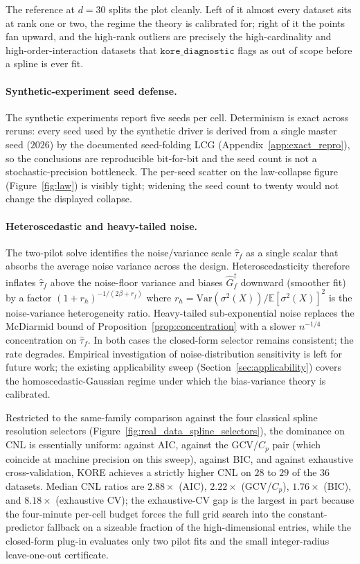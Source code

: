 \documentclass{article}
\newcommand{\KORE}{\textsc{KORE}}
\begin{document}
The reference at $d = 30$ splits the plot cleanly. Left of it almost every dataset sits at rank one or two, the regime the theory is calibrated for; right of it the points fan upward, and the high-rank outliers are precisely the high-cardinality and high-order-interaction datasets that $\texttt{kore\_diagnostic}$ flags as out of scope before a spline is ever fit.

\paragraph{Synthetic-experiment seed defense.}
The synthetic experiments report five seeds per cell. Determinism is exact across reruns: every seed used by the synthetic driver is derived from a single master seed ($2026$) by the documented seed-folding LCG (Appendix~\ref{app:exact_repro}), so the conclusions are reproducible bit-for-bit and the seed count is not a stochastic-precision bottleneck. The per-seed scatter on the law-collapse figure (Figure~\ref{fig:law}) is visibly tight; widening the seed count to twenty would not change the displayed collapse.

\paragraph{Heteroscedastic and heavy-tailed noise.}
The two-pilot solve identifies the noise/variance scale $\widehat \tau_f$ as a single scalar that absorbs the average noise variance across the design. Heteroscedasticity therefore inflates $\widehat \tau_f$ above the noise-floor variance and biases $\widehat G_f^\dagger$ downward (smoother fit) by a factor $(1 + r_h)^{-1/(2\beta + r_f)}$ where $r_h = \mathrm{Var}(\sigma^2(X))/\mathbb{E}[\sigma^2(X)]^2$ is the noise-variance heterogeneity ratio. Heavy-tailed sub-exponential noise replaces the McDiarmid bound of Proposition~\ref{prop:concentration} with a slower $n^{-1/4}$ concentration on $\widehat \tau_f$. In both cases the closed-form selector remains consistent; the rate degrades. Empirical investigation of noise-distribution sensitivity is left for future work; the existing applicability sweep (Section~\ref{sec:applicability}) covers the homoscedastic-Gaussian regime under which the bias-variance theory is calibrated.

Restricted to the same-family comparison against the four classical spline resolution selectors (Figure~\ref{fig:real_data_spline_selectors}), the dominance on CNL is essentially uniform: against AIC, against the GCV/$C_p$ pair (which coincide at machine precision on this sweep), against BIC, and against exhaustive cross-validation, \KORE{} achieves a strictly higher CNL on $28$ to $29$ of the $36$ datasets. Median CNL ratios are $2.88\times$ (AIC), $2.22\times$ (GCV/$C_p$), $1.76\times$ (BIC), and $8.18\times$ (exhaustive CV); the exhaustive-CV gap is the largest in part because the four-minute per-cell budget forces the full grid search into the constant-predictor fallback on a sizeable fraction of the high-dimensional entries, while the closed-form plug-in evaluates only two pilot fits and the small integer-radius leave-one-out certificate.
\end{document}
